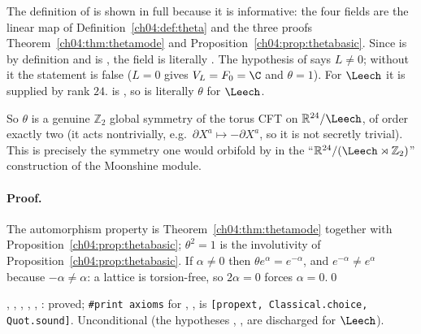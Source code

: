 \begin{dictionary}
The definition of  is shown in full because it is informative: the four fields are
the linear map of Definition~\ref{ch04:def:theta} and the three proofs
Theorem~\ref{ch04:thm:thetamode} and Proposition~\ref{ch04:prop:thetabasic}. Since
 is by definition  and  is
, the field  is literally . The hypothesis
 of  says $L\neq0$; without it the statement is false ($L=0$ gives
$V_L=F_0=\C$ and $\theta=1$). For $\Leech$ it is supplied by rank $24$.  is
, so  is literally $\theta$ for
$\Leech$.
\end{dictionary}

\begin{physics}
So $\theta$ is a genuine $\mathbb Z_2$ global symmetry of the torus CFT on $\mathbb R^{24}/\Leech$, of order exactly two (it acts nontrivially, e.g.\ $\partial X^a\mapsto-\partial X^a$, so it is not secretly trivial). This is precisely the symmetry one would orbifold by in the ``$\mathbb R^{24}/(\Leech\rtimes\mathbb Z_2)$'' construction of the Moonshine module.
\end{physics}

\paragraph{Proof.} The automorphism property is Theorem~\ref{ch04:thm:thetamode} together with
Proposition~\ref{ch04:prop:thetabasic}; $\theta^2=1$ is the involutivity of
Proposition~\ref{ch04:prop:thetabasic}. If $\alpha\neq0$ then $\theta e^\alpha=e^{-\alpha}$, and
$e^{-\alpha}\neq e^{\alpha}$ because $-\alpha\neq\alpha$: a lattice is torsion-free, so $2\alpha=0$
forces $\alpha=0$.\qed

\begin{status}
, , , ,
, : proved; \texttt{\#print axioms} for
, ,  is
\texttt{[propext, Classical.choice, Quot.sound]}. Unconditional (the hypotheses ,
,  are discharged for $\Leech$).
\end{status}

